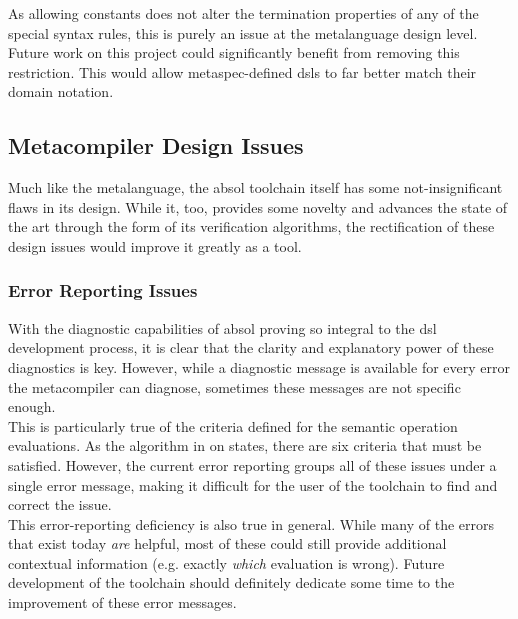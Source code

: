 As allowing constants does not alter the termination properties of any of the special syntax rules, this is purely an issue at the metalanguage design level.
Future work on this project could significantly benefit from removing this restriction.
This would allow \gls{metaspec}-defined \glspl{dsl} to far better match their domain notation.



\subsection{Metacompiler Design Issues} %
\label{sub:metacompiler_design_issues}
Much like the metalanguage, the \gls{absol} toolchain itself has some not-insignificant flaws in its design. 
While it, too, provides some novelty and advances the state of the art through the form of its verification algorithms, the rectification of these design issues would improve it greatly as a tool.

\subsubsection{Error Reporting Issues} %
\label{ssub:error_reporting_issues}
With the diagnostic capabilities of \gls{absol} proving so integral to the \gls{dsl} development process, it is clear that the clarity and explanatory power of these diagnostics is key.
However, while a diagnostic message is available for every error the metacompiler can diagnose, sometimes these messages are not specific enough.\\

This is particularly true of the criteria defined for the semantic operation evaluations.
As the algorithm in  on  states, there are six criteria that must be satisfied.
However, the current error reporting groups all of these issues under a single error message, making it difficult for the user of the toolchain to find and correct the issue.\\

This error-reporting deficiency is also true in general.
While many of the errors that exist today \textit{are} helpful, most of these could still provide additional contextual information (e.g. exactly \textit{which} evaluation is wrong).
Future development of the toolchain should definitely dedicate some time to the improvement of these error messages.

